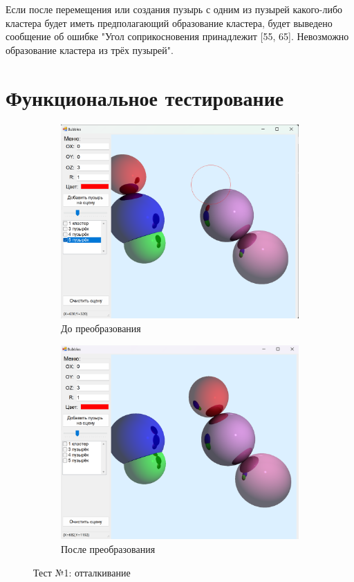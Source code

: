 Если после перемещения или создания пузырь с одним из пузырей какого-либо кластера будет иметь предполагающий образование кластера, будет выведено сообщение об ошибке "Угол соприкосновения принадлежит [55, 65]. Невозможно образование кластера из трёх пузырей".

\section{Функциональное тестирование}
\begin{figure}[h]
	\centering
	\begin{subfigure}{0.45\textwidth}
		\includegraphics[width=\linewidth]{pictures/test1_1.png}
		\caption{До преобразования}
		\label{fig:1first}
	\end{subfigure}
	\hfill
	\begin{subfigure}{0.45\textwidth}
		\includegraphics[width=\linewidth]{pictures/test1_2.png}
		\caption{После преобразования}
		\label{fig:1second}
	\end{subfigure}
	\caption{Тест №1: отталкивание}
	\label{fig:test1}
\end{figure}
